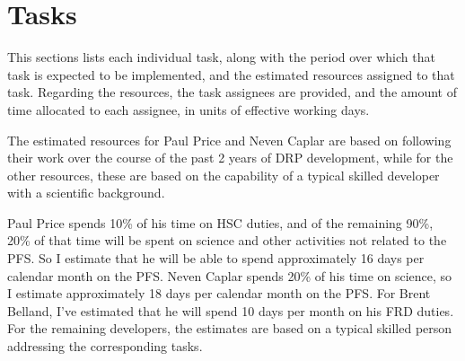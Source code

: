 \section{Tasks}

This sections lists each individual task, along with the period over which that task is expected to be implemented, and the estimated resources assigned to that task. 
Regarding the resources, the task assignees are provided, and the amount of time allocated to each assignee, in units of effective working days.

The estimated resources for Paul Price and Neven Caplar are based on following their work over the course of the past 2 years of DRP development, while for the other
resources, these are based on the capability of a typical skilled developer with a scientific background. 

Paul Price spends 10\% of his time on HSC duties, and of the remaining 90\%, 20\% of that time will be spent on science and other activities not related to the PFS. So I estimate that he will be able to spend approximately 16 days per calendar month on the PFS. Neven Caplar spends 20\% of his time on science, so I estimate approximately 18 days per calendar month on the PFS. For Brent Belland, I've estimated that he will spend 10 days per month on his FRD duties. For the remaining developers, the estimates are based on a typical skilled person addressing the corresponding tasks. 


